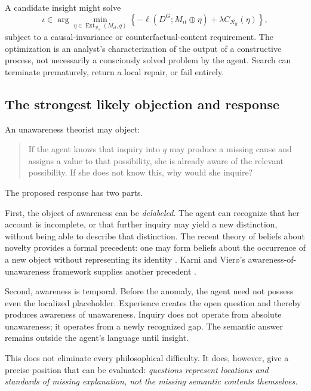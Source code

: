 \documentclass[11pt]{article}
\newcommand{\R}{\mathcal{R}}
\newcommand{\Ext}{\operatorname{Ext}}
\begin{document}
	A candidate insight might solve
	\begin{equation}
		\iota
		\in
		\arg\min_{\eta\in\Ext_{\R_{it}}(M_{it},q)}
		\left\{-\ell(D^G;M_{it}\oplus\eta)
		+\lambda C_{\R_{it}}(\eta)\right\},
	\end{equation}
	subject to a causal-invariance or counterfactual-content requirement.  The optimization is an analyst's characterization of the output of a constructive process, not necessarily a consciously solved problem by the agent.  Search can terminate prematurely, return a local repair, or fail entirely.
	
	\subsection{The strongest likely objection and response}
	
	An unawareness theorist may object:
	\begin{quote}
		If the agent knows that inquiry into $q$ may produce a missing cause and assigns a value to that possibility, she is already aware of the relevant possibility.  If she does not know this, why would she inquire?
	\end{quote}
	
	The proposed response has two parts.
	
	First, the object of awareness can be \emph{delabeled}.  The agent can recognize that her account is incomplete, or that further inquiry may yield a new distinction, without being able to describe that distinction.  The recent theory of beliefs about novelty provides a formal precedent: one may form beliefs about the occurrence of a new object without representing its identity \citep{Schipper2025}.  Karni and Vier\o's awareness-of-unawareness framework supplies another precedent \citep{KarniViero2017}.
	
	Second, awareness is temporal.  Before the anomaly, the agent need not possess even the localized placeholder.  Experience creates the open question and thereby produces awareness of unawareness.  Inquiry does not operate from absolute unawareness; it operates from a newly recognized gap.  The semantic answer remains outside the agent's language until insight.
	
	This does not eliminate every philosophical difficulty.  It does, however, give a precise position that can be evaluated: \emph{questions represent locations and standards of missing explanation, not the missing semantic contents themselves.}
	
\end{document}
